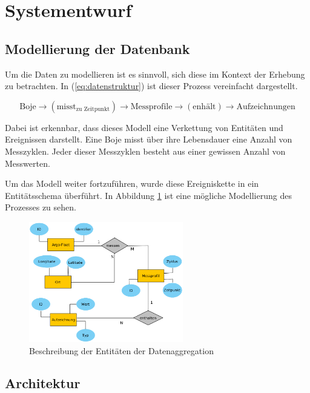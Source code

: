 \section{Systementwurf}

\subsection{Modellierung der Datenbank}

Um die Daten zu modellieren ist es sinnvoll, sich diese im Kontext der Erhebung zu betrachten. In (\ref{eq:datenstruktur}) ist dieser Prozess vereinfacht dargestellt.

\begin{equation}
    \mbox{Boje} \to (\mbox{misst}_{\mbox{zu Zeitpunkt}}) \to \mbox{Messprofile} \to ( \mbox{enhält} ) \to \mbox{Aufzeichnungen} \label{eq:datenstruktur}
\end{equation}

Dabei ist erkennbar, dass dieses Modell eine Verkettung von Entitäten und Ereignissen darstellt. Eine Boje misst über ihre Lebensdauer eine Anzahl von Messzyklen. Jeder dieser Messzyklen besteht aus einer gewissen Anzahl von Messwerten.

Um das Modell weiter fortzuführen, wurde diese Ereigniskette in ein Entitätsschema überführt. In Abbildung \ref{fig:ERM} ist eine mögliche Modellierung des Prozesses zu sehen. 

\begin{figure}[h!]
    \centering
    \includegraphics[width=0.6\textwidth,clip=true,trim=0pt 0pt 0pt 0pt]{pix/erm.png}
    \caption{Beschreibung der Entitäten der Datenaggregation}
    \label{fig:ERM}
\end{figure}



    
   
\subsection{Architektur}
    
